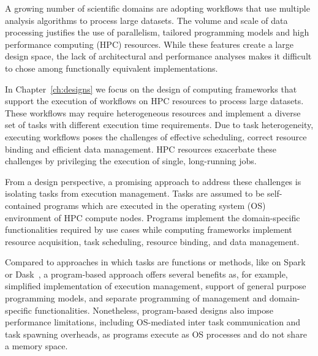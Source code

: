 A growing number of scientific domains are adopting workflows that use multiple analysis algorithms to process large datasets.
The volume and scale of data processing justifies the use of parallelism, tailored programming models and high performance computing (HPC) resources.
While these features create a large design space, the lack of architectural and performance analyses makes it difficult to chose among functionally equivalent implementations.

In Chapter~\ref{ch:designs} we focus on the design of computing frameworks that support the execution of workflows on HPC resources to process large datasets.
These workflows may require heterogeneous resources and implement a diverse set of tasks with different execution time requirements.
Due to task heterogeneity, executing workflows poses the challenges of effective scheduling, correct resource binding and efficient data management.
HPC resources exacerbate these challenges by privileging the execution of single, long-running jobs.


From a design perspective, a promising approach to address these challenges is isolating tasks from execution management.
Tasks are assumed to be self-contained programs which are executed in the operating system (OS) environment of HPC compute nodes.
Programs implement the domain-specific functionalities required by use cases while computing frameworks implement resource acquisition, task scheduling, resource binding, and data management.

Compared to approaches in which tasks are functions or methods, like on Spark~\cite{zaharia2010spark} or Dask~\cite{rocklin2015dask}, a program-based approach offers several benefits as, for example, simplified implementation of execution management, support of general purpose programming models, and separate programming of management and domain-specific functionalities.
Nonetheless, program-based designs also impose performance limitations, including OS-mediated inter task communication and task spawning overheads, as programs execute as OS processes and do not share a memory space.

